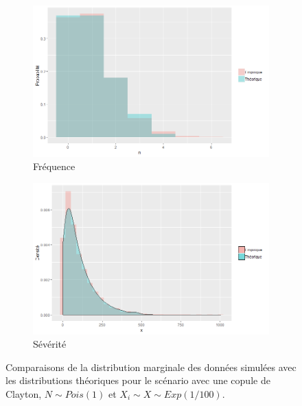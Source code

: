 \documentclass{article}
\begin{document}
	\begin{figure}[H]
		\begin{subfigure}[l]{0.5\textwidth}
			\includegraphics[width=\textwidth]{Graph/Clayton_Poiss_1_N.png}
			\caption{Fréquence}
		\end{subfigure}
		\begin{subfigure}[r]{0.5\textwidth}
			\includegraphics[width=\textwidth]{Graph/Clayton_Poiss_1_X.png}
			\caption{Sévérité}
		\end{subfigure}
		\caption{Comparaisons de la distribution marginale des données simulées avec les distributions théoriques pour le scénario avec une copule de Clayton, $N \sim Pois(1)$ et $X_i \sim X \sim Exp(1/100)$.}\label{graph_densite_Poisson_1}
	\end{figure}
\end{document}

